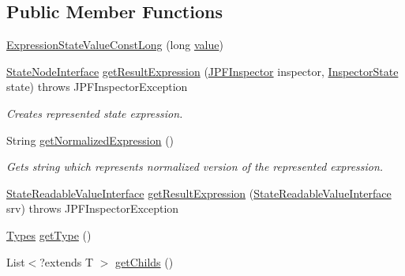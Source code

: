 \subsection*{Public Member Functions}
\begin{DoxyCompactItemize}
\item 
\hyperlink{classgov_1_1nasa_1_1jpf_1_1inspector_1_1server_1_1expression_1_1expressions_1_1_expression_state_value_const_long_a83ba5d078221b57939429b39add7606e}{Expression\+State\+Value\+Const\+Long} (long \hyperlink{classgov_1_1nasa_1_1jpf_1_1inspector_1_1server_1_1expression_1_1expressions_1_1_expression_state_value_const_long_aca83e5db34ca840e172b2ad55feb8c40}{value})
\item 
\hyperlink{interfacegov_1_1nasa_1_1jpf_1_1inspector_1_1server_1_1programstate_1_1_state_node_interface}{State\+Node\+Interface} \hyperlink{classgov_1_1nasa_1_1jpf_1_1inspector_1_1server_1_1expression_1_1expressions_1_1_expression_state_value_const_long_a770a1cd80b919acf0a4d2b2311712fed}{get\+Result\+Expression} (\hyperlink{classgov_1_1nasa_1_1jpf_1_1inspector_1_1server_1_1jpf_1_1_j_p_f_inspector}{J\+P\+F\+Inspector} inspector, \hyperlink{interfacegov_1_1nasa_1_1jpf_1_1inspector_1_1server_1_1expression_1_1_inspector_state}{Inspector\+State} state)  throws J\+P\+F\+Inspector\+Exception 
\begin{DoxyCompactList}\small\item\em Creates represented state expression. \end{DoxyCompactList}\item 
String \hyperlink{classgov_1_1nasa_1_1jpf_1_1inspector_1_1server_1_1expression_1_1expressions_1_1_expression_state_value_const_long_afb79a67f6c4892a3a2660e9ef30926b1}{get\+Normalized\+Expression} ()
\begin{DoxyCompactList}\small\item\em Gets string which represents normalized version of the represented expression. \end{DoxyCompactList}\item 
\hyperlink{interfacegov_1_1nasa_1_1jpf_1_1inspector_1_1server_1_1programstate_1_1_state_readable_value_interface}{State\+Readable\+Value\+Interface} \hyperlink{classgov_1_1nasa_1_1jpf_1_1inspector_1_1server_1_1expression_1_1expressions_1_1_expression_state_value_const_a11bde76b1048dc08cc72bb596c357c7c}{get\+Result\+Expression} (\hyperlink{interfacegov_1_1nasa_1_1jpf_1_1inspector_1_1server_1_1programstate_1_1_state_readable_value_interface}{State\+Readable\+Value\+Interface} srv)  throws J\+P\+F\+Inspector\+Exception 
\item 
\hyperlink{enumgov_1_1nasa_1_1jpf_1_1inspector_1_1server_1_1expression_1_1_types}{Types} \hyperlink{classgov_1_1nasa_1_1jpf_1_1inspector_1_1server_1_1expression_1_1expressions_1_1_expression_state_value_a9317f49f60c166a2f46f90702e75f22e}{get\+Type} ()
\item 
List$<$?extends T $>$ \hyperlink{classgov_1_1nasa_1_1jpf_1_1inspector_1_1server_1_1expression_1_1_expression_state_unary_operator_ad010bcb9c4e2eb584321b5ceba8e1682}{get\+Childs} ()
\end{DoxyCompactItemize}
